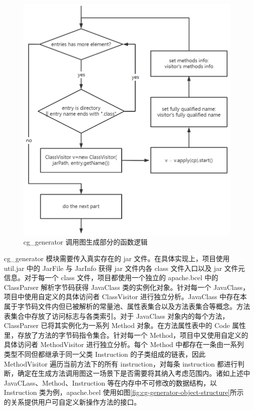 \begin{figure}
    \centering
    \includegraphics[width=.9\textwidth]{figures/cg-generator-jcallgraph.png}
    \caption{cg\_generator 调用图生成部分的函数逻辑}
    \label{fig:cg-generator-jcallgraph}
\end{figure}

cg\_generator 模块需要传入真实存在的 jar 文件。在具体实现上，项目使用 util.jar 中的 JarFile 与 JarInfo 获得 jar 文件内各 class 文件入口以及 jar 文件元信息。对于每一个 class 文件，项目都使用一个独立的 apache.bcel 中的 ClassParser 解析字节码获得 JavaClass 类的实例化对象。针对每一个 JavaClass，项目中使用自定义的具体访问者 ClassVisitor 进行独立分析。JavaClass 中存在本属于字节码文件内但已被解析的常量池、属性表集合以及方法表集合等概念。方法表集合中存放了访问标志与各类索引\cite{UNDERSTANDINGJVM}。对于 JavaClass 对象内的每个方法，ClassParser 已将其实例化为一系列 Method 对象。在方法属性表中的 Code 属性里，存放了方法的字节码指令集合\cite{UNDERSTANDINGJVM}。针对每一个 Method，项目中又使用自定义的具体访问者 MethodVisitor 进行独立分析。每个 Method 中都存在一条由一系列类型不同但都继承于同一父类 Instruction 的子类组成的链表，因此 MethodVisitor 遍历当前方法下的所有 instruction，对每条 instruction 都进行判断，确定在生成方法调用图这一场景下是否需要将其纳入考虑范围内。诸如上述中 JavaCLass、Method、Instruction 等在内存中不可修改的数据结构，以 Instruction 类为例，apache.bcel 使用如图\ref{fig:cg-generator-object-structure}所示的关系提供用户可自定义新操作方法的接口。

